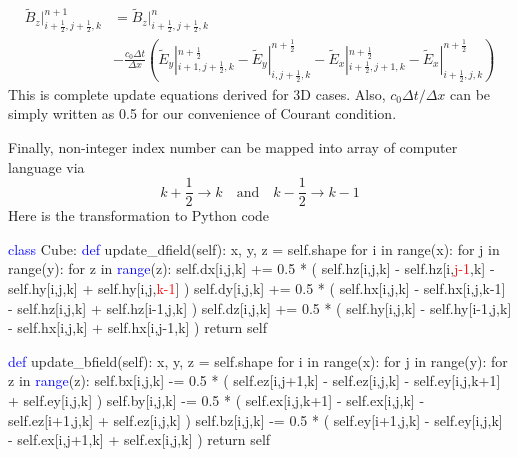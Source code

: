 \begin{equation}
  \begin{split}
    \widetilde{B}_z|_{i+\frac{1}{2},j+\frac{1}{2},k}^{n+1} & = \widetilde{B}_z|_{i+\frac{1}{2},j+\frac{1}{2},k}^{n}\\
    & - \frac{c_0\Delta t}{\Delta x}\left(\widetilde{E}_y|_{i+1,j+\frac{1}{2},k}^{n+\frac{1}{2}} - \widetilde{E}_y|_{i,j+\frac{1}{2},k}^{n+\frac{1}{2}} - \widetilde{E}_x|_{i+\frac{1}{2},j+1,k}^{n+\frac{1}{2}} - \widetilde{E}_x|_{i+\frac{1}{2},j,k}^{n+\frac{1}{2}}\right)
  \end{split}
\end{equation}
This is complete update equations derived for 3D cases. Also, $c_0\Delta t/\Delta x$ can be simply written as 0.5 for
our convenience of Courant condition.

Finally, non-integer index number can be mapped into array of computer language via
\begin{equation}
  k+\frac{1}{2}\rightarrow k\quad \mathrm{and} \quad
  k-\frac{1}{2}\rightarrow k-1
\end{equation}
Here is the transformation to Python code
\begin{code}
\textcolor{blue}{class} Cube:
    \textcolor{blue}{def} update\_dfield(self):
        x, y, z = self.shape
        for i in range(x):
            for j in range(y):
                for z in \textcolor{blue}{range}(z):
                    self.dx[i,j,k] += 0.5 * ( self.hz[i,j,k] - self.hz[i,\textcolor{red}{j-1},k] 
                                            - self.hy[i,j,k] + self.hy[i,j,\textcolor{red}{k-1}] )
                    self.dy[i,j,k] += 0.5 * ( self.hx[i,j,k] - self.hx[i,j,k-1] 
                                            - self.hz[i,j,k] + self.hz[i-1,j,k] )
                    self.dz[i,j,k] += 0.5 * ( self.hy[i,j,k] - self.hy[i-1,j,k] 
                                            - self.hx[i,j,k] + self.hx[i,j-1,k] )
    return self

    \textcolor{blue}{def} update\_bfield(self):
        x, y, z = self.shape
        for i in range(x):
            for j in range(y):
                for z in \textcolor{blue}{range}(z):
                    self.bx[i,j,k] -= 0.5 * ( self.ez[i,j+1,k] - self.ez[i,j,k] 
                                            - self.ey[i,j,k+1] + self.ey[i,j,k] )
                    self.by[i,j,k] -= 0.5 * ( self.ex[i,j,k+1] - self.ex[i,j,k] 
                                            - self.ez[i+1,j,k] + self.ez[i,j,k] )
                    self.bz[i,j,k] -= 0.5 * ( self.ey[i+1,j,k] - self.ey[i,j,k] 
                                            - self.ex[i,j+1,k] + self.ex[i,j,k] )
        return self
\end{code}




